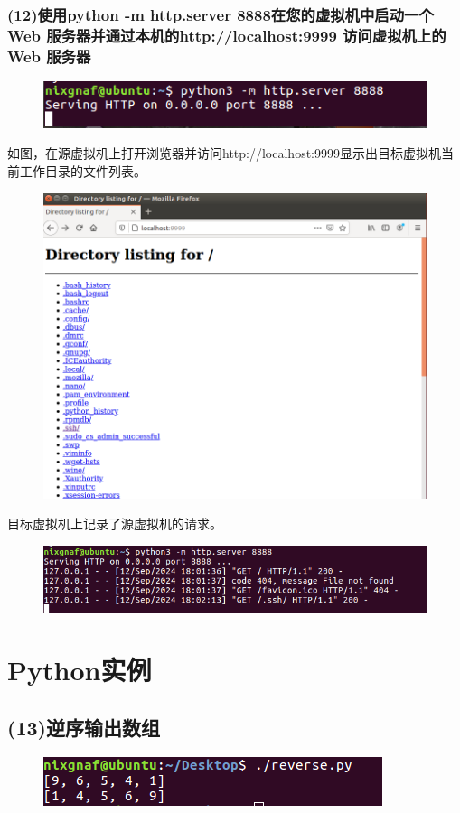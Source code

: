\documentclass{article}
\begin{document}
\newpage
\subsubsection{(12)使用python -m http.server 8888在您的虚拟机中启动一个 Web 服务器并通过本机的http://localhost:9999 访问虚拟机上的 Web 服务器 }
\begin{figure}[h]
    \centering
    \includegraphics[width=0.75\linewidth]{image13.png}
\end{figure}
\noindent 如图，在源虚拟机上打开浏览器并访问http://localhost:9999显示出目标虚拟机当前工作目录的文件列表。
\begin{figure}[h]
    \centering
    \includegraphics[width=0.75\linewidth]{image14.png}
\end{figure}

\noindent 目标虚拟机上记录了源虚拟机的请求。

\begin{figure}[h]
    \centering
    \includegraphics[width=0.75\linewidth]{image15.png}
\end{figure}

\newpage
\section{Python实例}

\subsection{(13)逆序输出数组}

\begin{figure}[h]
    \centering
    \includegraphics[width=0.5\linewidth]{image17.png}
\end{figure}
\end{document}
